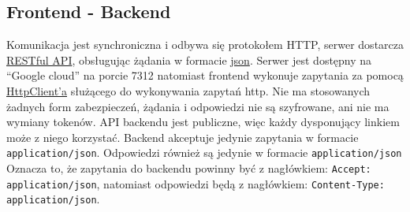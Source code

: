 \documentclass{article}
\begin{document}
  \subsection{Frontend - Backend}
  Komunikacja jest synchroniczna i odbywa się protokołem HTTP, serwer dostarcza
  \href{https://en.wikipedia.org/wiki/Representational_state_transfer}{RESTful API},
  obsługując żądania w formacie
  \href{https://en.wikipedia.org/wiki/JSON}{json}.
  Serwer jest dostępny na ``Google cloud'' na porcie 7312
  natomiast frontend wykonuje zapytania za pomocą
  \href{https://angular.io/guide/http}{HttpClient'a} służącego do wykonywania zapytań http.
  Nie ma stosowanych żadnych form zabezpieczeń, żądania i odpowiedzi nie są szyfrowane, ani nie ma wymiany tokenów.
  API backendu jest publiczne, więc każdy dysponujący linkiem może z niego korzystać.
  Backend akceptuje jedynie zapytania w formacie \texttt{application/json}.
  Odpowiedzi również są jedynie w formacie \texttt{application/json}
  Oznacza to, że zapytania do backendu powinny być z nagłówkiem: \texttt{Accept: application/json},
  natomiast odpowiedzi będą z nagłówkiem: \texttt{Content-Type: application/json}.
\end{document}
